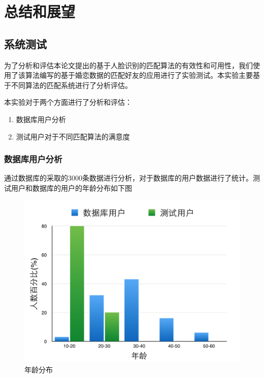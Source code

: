 
\chapter{总结和展望}
\section{系统测试}
为了分析和评估本论文提出的基于人脸识别的匹配算法的有效性和可用性，我们使用了该算法编写的基于婚恋数据的匹配好友的应用进行了实验测试。本实验主要基于不同算法的匹配系统进行了分析评估。

本实验对于两个方面进行了分析和评估：
\begin{enumerate}
\item 数据库用户分析
\item 测试用户对于不同匹配算法的满意度
\end{enumerate}
\subsection{数据库用户分析}
通过数据库的采取的3000条数据进行分析，对于数据库的用户数据进行了统计。测试用户和数据库的用户的年龄分布如下图
\begin{figure}[h] 
\begin{minipage}[t]{0.65\linewidth}

\centering

\includegraphics[width=\textwidth]{img/chap5/exp1.png}
\caption{年龄分布\label{instagram}}
\end{minipage}
\end{figure}

